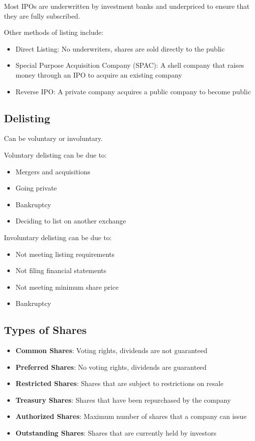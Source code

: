 Most IPOs are underwritten by investment banks and underpriced to ensure that they are fully subscribed.

Other methods of listing include:
\begin{itemize}
    \item Direct Listing: No underwriters, shares are sold directly to the public
    \item Special Purpose Acquisition Company (SPAC): A shell company that raises money through an IPO to acquire an existing company
	\item Reverse IPO: A private company acquires a public company to become public
\end{itemize}

\subsection{Delisting}
Can be voluntary or involuntary.

Voluntary delisting can be due to:
\begin{itemize}
    \item Mergers and acquisitions
    \item Going private
    \item Bankruptcy
    \item Deciding to list on another exchange
\end{itemize}

Involuntary delisting can be due to:
\begin{itemize}
    \item Not meeting listing requirements
    \item Not filing financial statements
    \item Not meeting minimum share price
    \item Bankruptcy
\end{itemize}

\subsection{Types of Shares}
\begin{itemize}
    \item \textbf{Common Shares}: Voting rights, dividends are not guaranteed
    \item \textbf{Preferred Shares}: No voting rights, dividends are guaranteed
    \item \textbf{Restricted Shares}: Shares that are subject to restrictions on resale
    \item \textbf{Treasury Shares}: Shares that have been repurchased by the company
    \item \textbf{Authorized Shares}: Maximum number of shares that a company can issue
    \item \textbf{Outstanding Shares}: Shares that are currently held by investors
\end{itemize}

